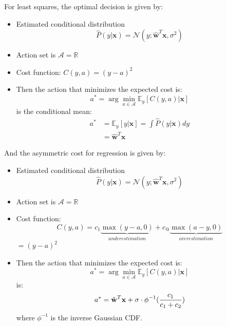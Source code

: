 \documentclass[a4paper,10pt,twoside]{article}
\begin{document}
For least squares, the optimal decision is given by:

\begin{itemize}
\item Estimated conditional distribution
  \begin{equation*}
    \hat{P}(y|\mathbf{x})=\mathcal{N}(y;\hat{\mathbf{w}}^T\mathbf{x},\sigma^2)
  \end{equation*}
\item Action set is $\mathcal{A}=\mathbb{R}$
\item Cost function: $C(y,a)=(y-a)^2$
\item Then the action that minimizes the expected cost is:
  \begin{equation*}
    a^*=\arg\min_{a\in\mathcal{A}}\mathbb{E}_y[C(y,a)|\mathbf{x}]
  \end{equation*}
  is the conditional mean:
  \begin{align*}
    a^*&=\mathbb{E}_y[y|\mathbf{x}]=\int\hat{P}(y|\mathbf{x})dy\\
    &=\hat{\mathbf{w}}^T\mathbf{x}
  \end{align*}
\end{itemize}

And the asymmetric cost for regression is given by:

\begin{itemize}
\item Estimated conditional distribution
  \begin{equation*}
    \hat{P}(y|\mathbf{x})=\mathcal{N}(y;\hat{\mathbf{w}}^T\mathbf{x},\sigma^2)
  \end{equation*}
\item Action set is $\mathcal{A}=\mathbb{R}$
\item Cost function:
  \begin{equation*}
    C(y,a) = c_1\underbrace{\max(y-a,0)}_{underestimation}+c_@\underbrace{\max(a-y,0)}_{overestimation}
  \end{equation*}
  $=(y-a)^2$
\item Then the action that minimizes the expected cost is:
  \begin{equation*}
    a^*=\arg\min_{a\in\mathcal{A}}\mathbb{E}_y[C(y,a)|\mathbf{x}]
  \end{equation*}
  is:
  \begin{equation*}
    a^*= \hat{\mathbf{w}}^T\mathbf{x}+\sigma\cdot\phi^{-1}({c_1\over c_1+c_2})
  \end{equation*}
where $\phi^{-1}$ is the inverse Gaussian CDF.
\end{itemize}
\end{document}
